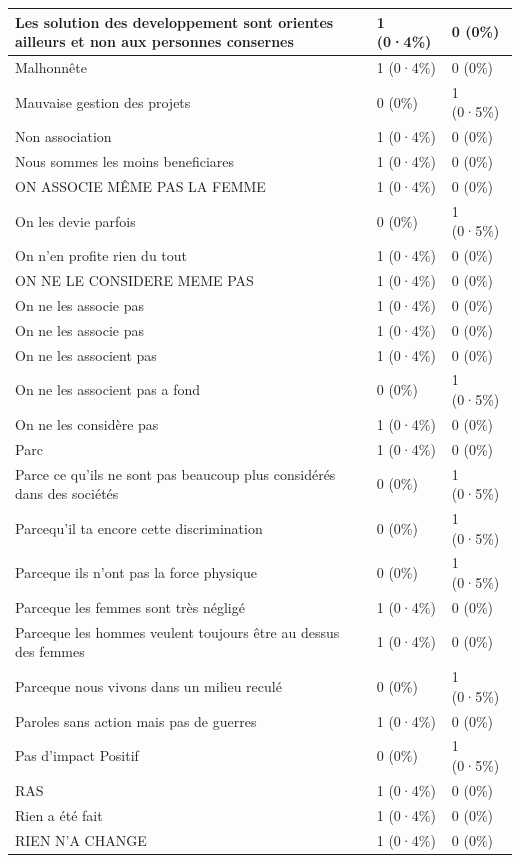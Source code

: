 \documentclass[
]{book}
\begin{document}
\begin{tabular}{l|l|l}
\hline
Les solution des developpement sont orientes ailleurs et non aux personnes consernes & 1 (0·4\%) & 0 (0\%)\\
\hline
Malhonnête & 1 (0·4\%) & 0 (0\%)\\
\hline
Mauvaise gestion des projets & 0 (0\%) & 1 (0·5\%)\\
\hline
Non association & 1 (0·4\%) & 0 (0\%)\\
\hline
Nous sommes les moins beneficiares & 1 (0·4\%) & 0 (0\%)\\
\hline
ON ASSOCIE MÊME PAS LA FEMME & 1 (0·4\%) & 0 (0\%)\\
\hline
On les devie parfois & 0 (0\%) & 1 (0·5\%)\\
\hline
On n'en profite rien du tout & 1 (0·4\%) & 0 (0\%)\\
\hline
ON NE LE CONSIDERE MEME PAS & 1 (0·4\%) & 0 (0\%)\\
\hline
On ne les associe  pas & 1 (0·4\%) & 0 (0\%)\\
\hline
On ne les associe pas & 1 (0·4\%) & 0 (0\%)\\
\hline
On ne les associent pas & 1 (0·4\%) & 0 (0\%)\\
\hline
On ne les associent pas a fond & 0 (0\%) & 1 (0·5\%)\\
\hline
On ne les considère pas & 1 (0·4\%) & 0 (0\%)\\
\hline
Parc & 1 (0·4\%) & 0 (0\%)\\
\hline
Parce ce qu'ils ne sont pas beaucoup plus considérés dans des sociétés & 0 (0\%) & 1 (0·5\%)\\
\hline
Parcequ'il ta encore cette discrimination & 0 (0\%) & 1 (0·5\%)\\
\hline
Parceque ils n'ont pas la force physique & 0 (0\%) & 1 (0·5\%)\\
\hline
Parceque les femmes sont très négligé & 1 (0·4\%) & 0 (0\%)\\
\hline
Parceque les hommes veulent toujours être au dessus des femmes & 1 (0·4\%) & 0 (0\%)\\
\hline
Parceque nous vivons dans un milieu reculé & 0 (0\%) & 1 (0·5\%)\\
\hline
Paroles sans action mais pas de guerres & 1 (0·4\%) & 0 (0\%)\\
\hline
Pas d'impact Positif & 0 (0\%) & 1 (0·5\%)\\
\hline
RAS & 1 (0·4\%) & 0 (0\%)\\
\hline
Rien a été fait & 1 (0·4\%) & 0 (0\%)\\
\hline
RIEN N'A CHANGE & 1 (0·4\%) & 0 (0\%)\\

\end{tabular}
\end{document}
